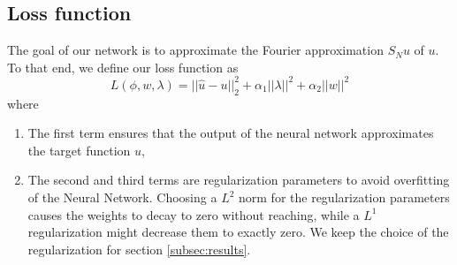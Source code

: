 \documentclass[AMS,STIX1COL]{WileyNJD-v2}
\begin{document}
\subsection{Loss function}
The goal of our network is to approximate the Fourier approximation $S_N u$ of $u$. To that end, we define our loss function as
 \begin{equation}\label{lossfunction}
     L(\phi, w, \lambda) = ||\hat{u} - u ||_2^2  + \alpha_1||\lambda||^2 + \alpha_2||w||^2
 \end{equation}
 where
 \begin{enumerate}
     \item The first term ensures that the output of the neural network approximates the target function $u$,
     \item The second and third terms are regularization parameters to avoid overfitting of the Neural Network. Choosing a $L^2$ norm for the regularization parameters causes the weights to decay to zero without reaching, while a $L^1$ regularization might decrease them to exactly zero. We keep the choice of the regularization for section \ref{subsec:results}.
 \end{enumerate}
 
\end{document}
